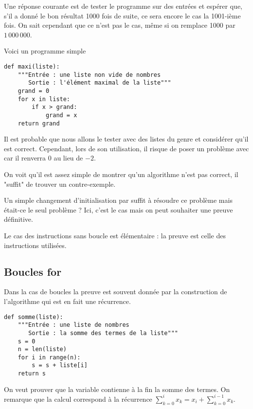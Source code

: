 Une réponse courante est de tester le programme sur des entrées et espérer que, s'il a donné le bon résultat 1000 fois de suite, ce sera encore le cas la 1001-ième fois. On sait cependant que ce n'est pas le cas, même si on remplace 1000 par $1\,000\,000$.

\medskip

Voici un programme simple
\begin{lstlisting}
def maxi(liste):
    """Entrée : une liste non vide de nombres
       Sortie : l'élément maximal de la liste"""
    grand = 0
    for x in liste:
        if x > grand:
            grand = x
    return grand
\end{lstlisting}
Il est probable que nous allons le tester avec des listes du genre \type{[25, 54, 37, 22]} et considérer qu'il est correct. Cependant, lors de son utilisation, il risque de poser un problème avec  car il renverra 0 au lieu de $-2$.

On voit qu'il est assez simple de montrer qu'un algorithme n'est pas correct, il "suffit" de trouver un contre-exemple.

Un simple changement d'initialisation par  suffit à résoudre ce problème mais était-ce le seul problème ? Ici, c'est le cas mais on peut souhaiter une preuve définitive.


Le cas des instructions sans boucle est élémentaire : la preuve est celle des instructions utilisées.
\subsection{Boucles for}
Dans la cas de boucles  la preuve est souvent donnée par la construction de l'algorithme qui est en fait une récurrence.
\begin{lstlisting}
def somme(liste):
    """Entrée : une liste de nombres 
       Sortie : la somme des termes de la liste"""
    s = 0
    n = len(liste)
    for i in range(n):
        s = s + liste[i]
    return s
\end{lstlisting} 
On veut prouver que la variable  contienne à la fin la somme des termes. On remarque que la calcul  correspond à la récurrence  $\displaystyle \sum_{k=0}^{i} x_k = x_i +\sum_{k=0}^{i-1} x_k$.

